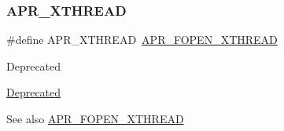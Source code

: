 \subsubsection{\texorpdfstring{A\+P\+R\+\_\+\+X\+T\+H\+R\+E\+AD}{APR\_XTHREAD}}
{\footnotesize\ttfamily \#define A\+P\+R\+\_\+\+X\+T\+H\+R\+E\+AD~\mbox{\hyperlink{group__apr__file__open__flags_ga435cd9b2604b11796779c23ffa00a3dd}{A\+P\+R\+\_\+\+F\+O\+P\+E\+N\+\_\+\+X\+T\+H\+R\+E\+AD}}}

\begin{DoxyRefDesc}{Deprecated}
\item[\mbox{\hyperlink{deprecated__deprecated000026}{Deprecated}}]\end{DoxyRefDesc}
\begin{DoxySeeAlso}{See also}
\mbox{\hyperlink{group__apr__file__open__flags_ga435cd9b2604b11796779c23ffa00a3dd}{A\+P\+R\+\_\+\+F\+O\+P\+E\+N\+\_\+\+X\+T\+H\+R\+E\+AD}} 
\end{DoxySeeAlso}
